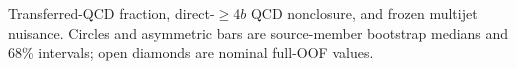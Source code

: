 Transferred-QCD fraction, direct-$\geq4b$ QCD nonclosure, and frozen multijet nuisance. Circles and asymmetric bars are source-member bootstrap medians and 68\% intervals; open diamonds are nominal full-OOF values.
